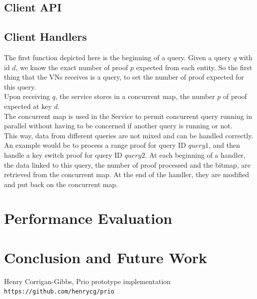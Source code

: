 \documentclass{article}
\begin{document}
\subsection{Client API}

\subsection{Client Handlers}
The first function depicted here is the beginning of a query. Given a query $q$ with id $d$, we know the exact number of proof $p$ expected from each entity. So the first thing that the VNs receives is a query, to set the number of proof expected for this query.\\
Upon receiving $q$, the service stores in a concurrent map, the number $p$ of proof expected at key $d$.\\
The concurrent map is used in the Service to permit concurrent query running in parallel without having to be concerned if another query is running or not.\\
This way, data from different queries are not mixed and can be handled correctly. An example would be to process a range proof for query ID $query1$, and then handle a key switch proof for query ID $query2$. At each beginning of a handler, the data linked to this query, the number of proof processed and the bitmap, are retrieved from the concurrent map. At the end of the handler, they are modified and put back on the concurrent map.
\section{Performance Evaluation}

\section{Conclusion and Future Work}
\begin{thebibliography}{9}
Henry Corrigan-Gibbs, Prio prototype implementation\\
\texttt{https://github.com/henrycg/prio}
\end{thebibliography}
\end{document}
